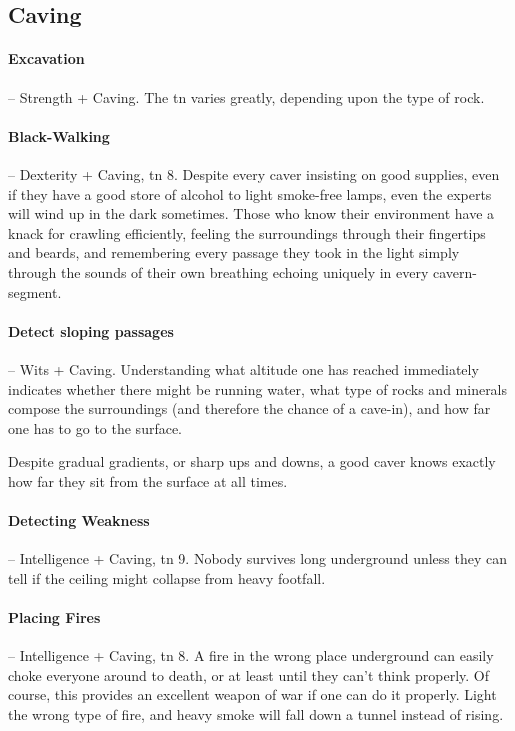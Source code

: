 \begin{multicols}{2}
\subsection{Caving}

\paragraph{Excavation} -- Strength + Caving.
The \gls{tn} varies greatly, depending upon the type of rock.

\paragraph{Black-Walking} -- Dexterity + Caving, \gls{tn} 8.
Despite every caver insisting on good supplies, even if they have a good store of alcohol to light smoke-free lamps, even the experts will wind up in the dark sometimes.
Those who know their environment have a knack for crawling efficiently, feeling the surroundings through their fingertips and beards, and remembering every passage they took in the light simply through the sounds of their own breathing echoing uniquely in every cavern-segment.

\paragraph{Detect sloping passages} -- Wits + Caving.
Understanding what altitude one has reached immediately indicates whether there might be running water, what type of rocks and minerals compose the surroundings (and therefore the chance of a cave-in), and how far one has to go to the surface.

Despite gradual gradients, or sharp ups and downs, a good caver knows exactly how far they sit from the surface at all times.

\paragraph{Detecting Weakness} -- Intelligence + Caving, \gls{tn} 9.
Nobody survives long underground unless they can tell if the ceiling might collapse from heavy footfall.

\paragraph{Placing Fires} -- Intelligence + Caving, \gls{tn} 8.
A fire in the wrong place underground can easily choke everyone around to death, or at least until they can't think properly.
Of course, this provides an excellent weapon of war if one can do it properly.
Light the wrong type of fire, and heavy smoke will fall down a tunnel instead of rising.


\end{multicols}
